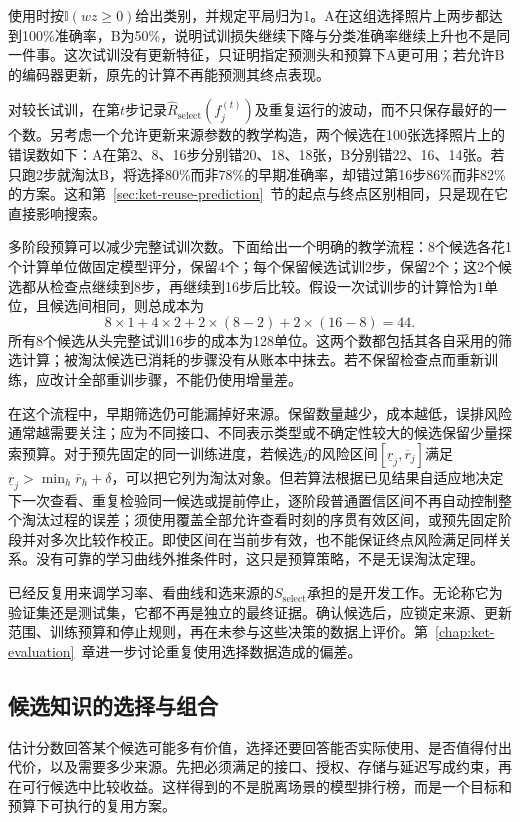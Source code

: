 使用时按$\mathbb I(wz\geq0)$给出类别，并规定平局归为1。A在这组选择照片上两步都达到100\%准确率，B为50\%，说明试训损失继续下降与分类准确率继续上升也不是同一件事。这次试训没有更新特征，只证明指定预测头和预算下A更可用；若允许B的编码器更新，原先的计算不再能预测其终点表现。

对较长试训，在第$t$步记录$\hat R_{\mathrm{select}}(f_j^{(t)})$及重复运行的波动，而不只保存最好的一个数。另考虑一个允许更新来源参数的教学构造，两个候选在100张选择照片上的错误数如下：A在第2、8、16步分别错20、18、18张，B分别错22、16、14张。若只跑2步就淘汰B，将选择80\%而非78\%的早期准确率，却错过第16步86\%而非82\%的方案。这和第~\ref{sec:ket-reuse-prediction}~节的起点与终点区别相同，只是现在它直接影响搜索。

多阶段预算可以减少完整试训次数。下面给出一个明确的教学流程：8个候选各花1个计算单位做固定模型评分，保留4个；每个保留候选试训2步，保留2个；这2个候选都从检查点继续到8步，再继续到16步后比较。假设一次试训步的计算恰为1单位，且候选间相同，则总成本为
\[
  8\times1+4\times2+2\times(8-2)+2\times(16-8)
  =44.
\]
所有8个候选从头完整试训16步的成本为128单位。这两个数都包括其各自采用的筛选计算；被淘汰候选已消耗的步骤没有从账本中抹去。若不保留检查点而重新训练，应改计全部重训步骤，不能仍使用增量差。

在这个流程中，早期筛选仍可能漏掉好来源。保留数量越少，成本越低，误排风险通常越需要关注；应为不同接口、不同表示类型或不确定性较大的候选保留少量探索预算。对于预先固定的同一训练进度，若候选$j$的风险区间$[\underline r_j,\overline r_j]$满足$\underline r_j>\min_h\overline r_h+\delta$，可以把它列为淘汰对象。但若算法根据已见结果自适应地决定下一次查看、重复检验同一候选或提前停止，逐阶段普通置信区间不再自动控制整个淘汰过程的误差；须使用覆盖全部允许查看时刻的序贯有效区间，或预先固定阶段并对多次比较作校正。即使区间在当前步有效，也不能保证终点风险满足同样关系。没有可靠的学习曲线外推条件时，这只是预算策略，不是无误淘汰定理。

已经反复用来调学习率、看曲线和选来源的$S_{\mathrm{select}}$承担的是开发工作。无论称它为验证集还是测试集，它都不再是独立的最终证据。确认候选后，应锁定来源、更新范围、训练预算和停止规则，再在未参与这些决策的数据上评价。第~\ref{chap:ket-evaluation}~章进一步讨论重复使用选择数据造成的偏差。

\subsection{候选知识的选择与组合}
\label{sec:ket-reuse-choice}

估计分数回答某个候选可能多有价值，选择还要回答能否实际使用、是否值得付出代价，以及需要多少来源。先把必须满足的接口、授权、存储与延迟写成约束，再在可行候选中比较收益。这样得到的不是脱离场景的模型排行榜，而是一个目标和预算下可执行的复用方案。

